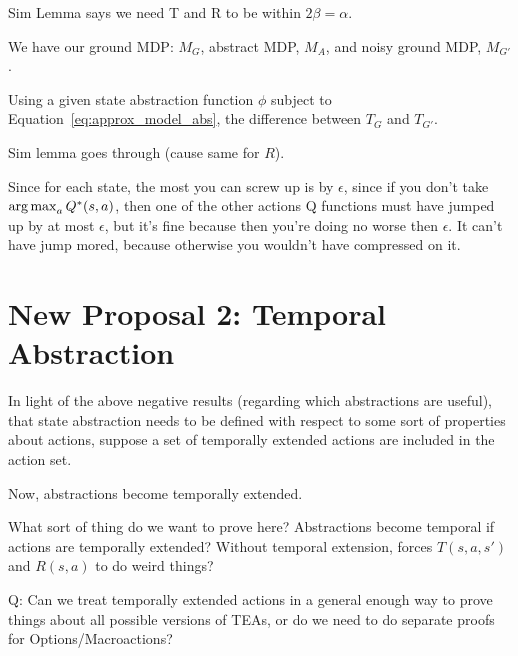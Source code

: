 \documentclass[11pt]{amsart}
\begin{document}
Sim Lemma says we need T and R to be within $2\beta = \alpha$.

We have our ground MDP: $M_G$, abstract MDP, $M_A$, and noisy ground MDP, $M_{G'}$.

Using a given state abstraction function $\phi$ subject to Equation~\ref{eq:approx_model_abs}, the difference between $T_G$ and $T_{G'}$.

Sim lemma goes through (cause same for $R$).


Since for each state, the most you can screw up is by $\epsilon$, since if you don't take $\operatorname*{arg\,max}_a Q^*(s,a)$, then one of the other actions Q functions must have jumped up by at most $\epsilon$, but it's fine because then you're doing no worse then $\epsilon$. It can't have jump mored, because otherwise you wouldn't have compressed on it.


\newpage
\section{New Proposal 2: Temporal Abstraction}

In light of the above negative results (regarding which abstractions are useful), that state abstraction needs to be defined with respect to some sort of properties about actions, suppose a set of temporally extended actions are included in the action set.

Now, abstractions become temporally extended.

What sort of thing do we want to prove here? Abstractions become temporal if actions are temporally extended? Without temporal extension, forces $T(s,a,s')$ and $R(s,a)$ to do weird things?

Q: Can we treat temporally extended actions in a general enough way to prove things about all possible versions of TEAs, or do we need to do separate proofs for Options/Macroactions?
\end{document}
